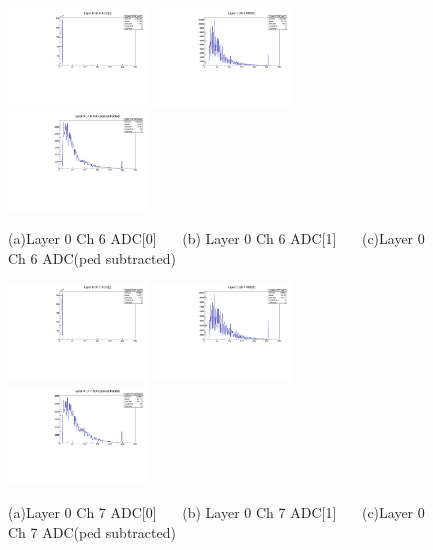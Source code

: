 \documentclass[a4paper,11pt]{article}
\theoremstyle{mytheor}
\begin{document}
\begin{figure}[H] 
\vspace*{-0.3cm} 
\includegraphics[width=0.33\textwidth,scale=0.5,trim=0 0 0 0,clip]{plotsdir/file0_test-Layer0_Ch6_adc0-1.pdf} 
\includegraphics[width=0.33\textwidth,scale=0.5,trim=0 0 0 0,clip]{plotsdir/file0_test-Layer0_Ch6_adc1-1.pdf} 
\includegraphics[width=0.33\textwidth,scale=0.5,trim=0 0 0 0,clip]{plotsdir/file0_test-Layer0_Ch6_adcPedsub-1.pdf} 
\caption{(a)Layer 0 Ch 6 ADC[0] ~~~(b) Layer 0 Ch 6 ADC[1] ~~~(c)Layer 0 Ch 6 ADC(ped subtracted) } 
\end{figure} 
\begin{figure}[H] 
\vspace*{-0.3cm} 
\includegraphics[width=0.33\textwidth,scale=0.5,trim=0 0 0 0,clip]{plotsdir/file0_test-Layer0_Ch7_adc0-1.pdf} 
\includegraphics[width=0.33\textwidth,scale=0.5,trim=0 0 0 0,clip]{plotsdir/file0_test-Layer0_Ch7_adc1-1.pdf} 
\includegraphics[width=0.33\textwidth,scale=0.5,trim=0 0 0 0,clip]{plotsdir/file0_test-Layer0_Ch7_adcPedsub-1.pdf} 
\caption{(a)Layer 0 Ch 7 ADC[0] ~~~(b) Layer 0 Ch 7 ADC[1] ~~~(c)Layer 0 Ch 7 ADC(ped subtracted) } 
\end{figure} 
\end{document}

